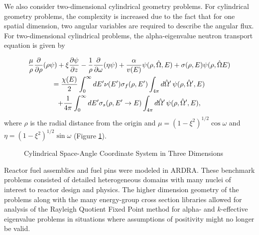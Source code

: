 We also consider two-dimensional cylindrical geometry problems. For cylindrical geometry problems, the complexity is increased due to the fact that for one spatial dimension, two angular variables are required to describe the angular flux. For two-dimensional cylindrical problems, the alpha-eigenvalue neutron transport equation is given by 

\begin{multline}
\frac{\mu}{\rho} \frac{\partial}{\partial \rho} (\rho \psi) + \xi \frac{\partial \psi}{\partial z} - \frac{1}{\rho} \frac{\partial}{\partial \omega} (\eta \psi) + \frac{\alpha}{v(E)} \psi(\rho,\hat{\Omega},E) + \sigma(\rho,E) \psi(\rho,\hat{\Omega}E) \\ = \frac{\chi(E)}{2} \int_{0}^{\infty} \mathop{}\!d E' \nu(E') \sigma_{f}(\rho,E') \int_{4\pi} \mathop{}\!d \hat{\Omega}' \, \psi(\rho, \hat{\Omega}',E) \\ + \frac{1}{4\pi} \int_{0}^{\infty} \mathop{}\!d E' \sigma_{s}(\rho, E' \rightarrow E) \int_{4\pi} \mathop{}\!d \hat{\Omega}' \, \psi(\rho, \hat{\Omega}',E),
\label{eq:2DCylAlpha}
\end{multline}
where $\rho$ is the radial distance from the origin and $\mu = (1-\xi^{2})^{1/2} \cos \omega$ and $\eta = (1-\xi^{2})^{1/2}\sin \omega$ (Figure \ref{fig:Cyl2D}).

\begin{figure}[!htbp]
\centering
\resizebox{0.55\textwidth}{!}{
	
%	
	}
	\caption{Cylindrical Space-Angle Coordinate System in Three Dimensions}
	\label{fig:Cyl2D}
\end{figure}

Reactor fuel assemblies and fuel pins were modeled in ARDRA. These benchmark problems consisted of detailed heterogeneous domains with many nuclei of interest to reactor design and physics. The higher dimension geometry of the problems along with the many energy-group cross section libraries allowed for analysis of the Rayleigh Quotient Fixed Point method for alpha- and $k$-effective eigenvalue problems in situations where assumptions of positivity might no longer be valid.

